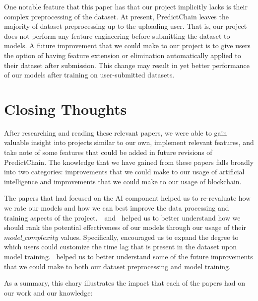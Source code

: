 \documentclass{article}
\begin{document}
    One notable feature that this paper has that our project implicitly lacks is their complex preprocessing of
    the dataset.  At present, PredictChain leaves the majority of dataset preprocessing up to the uploading user.
    That is, our project does not perform any feature engineering before submitting the dataset to models.  A future
    improvement that we could make to our project is to give users the option of having feature extension or elimination
    automatically applied to their dataset after submission.  This change may result in yet better performance of our
    models after training on user-submitted datasets.

    \section{Closing Thoughts}

    After researching and reading these relevant papers, we were able to gain valuable insight into projects similar to
    our own, implement relevant features, and take note of some features that could be added in future revisions of
    PredictChain.  The knowledge that we have gained from these papers falls broadly into two categories: improvements
    that we could make to our usage of artificial intelligence and improvements that we could make to our usage of
    blockchain.

    The papers that had focused on the AI component helped us to re-revaluate how we rate our models and how we can best
    improve the data processing and training aspects of the project.~\cite{LSTM}~and~\cite{recurrentModeling} helped
    us to better understand how we should rank the potential effectiveness of our models through our usage of
    their $model\_complexity$ values.  Specifically, \cite{LSTM} encouraged us to expand the degree to
    which users could customize the time lag that is present in the dataset upon model training.~\cite{deepPrediction}
    helped us to better understand some of the future improvements that we could make to both our dataset preprocessing
    and model training.


    As a summary, this chary illustrates the impact that each of the papers had on our work and our knowledge:
\end{document}
